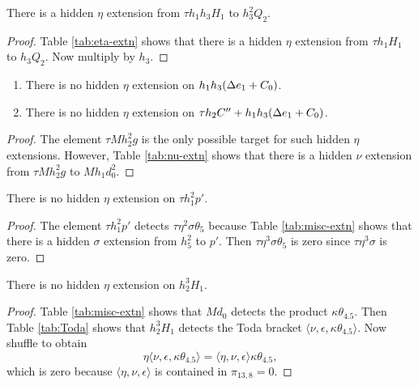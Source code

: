 \begin{lemma}
\label{lem:eta-th1h3H1}
There is a hidden $\eta$ extension from $\tau h_1 h_3 H_1$ to
$h_3^2 Q_2$.
\end{lemma}

\begin{proof}
Table \ref{tab:eta-extn} shows that there is a hidden $\eta$ extension
from $\tau h_1 H_1$ to $h_3 Q_2$.  Now multiply by $h_3$.
\end{proof}

\begin{lemma}
\label{lem:eta-h1h3(De1+C0)}
\mbox{}
\begin{enumerate}
\item
{}
There is no hidden $\eta$ extension on $h_1 h_3 (\Delta e_1 + C_0)$.
\item
{}
There is no hidden $\eta$ extension on 
$\tau h_2 C'' + h_1 h_3 (\Delta e_1 + C_0)$.
\end{enumerate}
\end{lemma}

\begin{proof}
The element $\tau M h_2^2 g$ is the 
only possible target for such hidden $\eta$ extensions.
However, Table \ref{tab:nu-extn} shows that there is a hidden
$\nu$ extension from $\tau M h_2^2 g$ to $M h_1 d_0^2$.
\end{proof}

\begin{lemma}
\label{lem:eta-th1^2p'}
There is no hidden $\eta$ extension on $\tau h_1^2 p'$.
\end{lemma}

\begin{proof}
The element $\tau h_1^2 p'$ detects 
$\tau \eta^2 \sigma \theta_5$ because Table \ref{tab:misc-extn}
shows that there is a hidden $\sigma$ extension from
$h_5^2$ to $p'$.
Then $\tau \eta^3 \sigma \theta_5$ is zero since
$\tau \eta^3 \sigma$ is zero.
\end{proof}

\begin{lemma}
\label{lem:eta-h1^2h3H1}
There is no hidden $\eta$ extension on $h_2^3 H_1$.
\end{lemma}

\begin{proof}
Table \ref{tab:misc-extn} shows that $M d_0$ detects the product
$\kappa \theta_{4.5}$.  Then
Table \ref{tab:Toda} shows that $h_2^3 H_1$ detects the
Toda bracket $\langle \nu, \epsilon, \kappa \theta_{4.5} \rangle$.
Now shuffle to obtain
\[
\eta \langle \nu, \epsilon, \kappa \theta_{4.5} \rangle =
\langle \eta, \nu, \epsilon \rangle \kappa \theta_{4.5},
\]
which is zero because $\langle \eta, \nu, \epsilon \rangle$
is contained in $\pi_{13,8} = 0$.
\end{proof}

